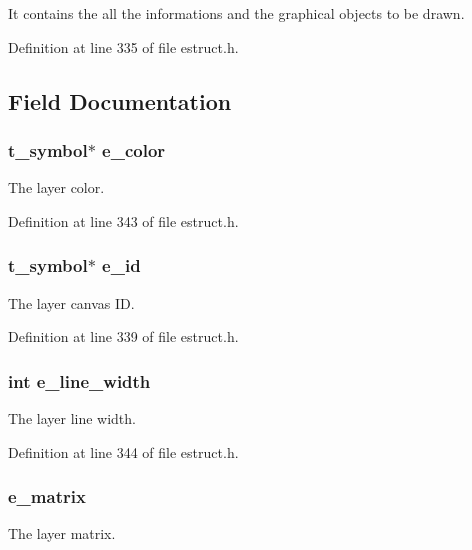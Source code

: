 It contains the all the informations and the graphical objects to be drawn. 

Definition at line 335 of file estruct.\-h.



\subsection{Field Documentation}
\hypertarget{struct__elayer_a13dfb00aea95e0dc5b9d1297260a9280}{
\subsubsection[{e\-\_\-color}]{\setlength{\rightskip}{0pt plus 5cm}t\-\_\-symbol$\ast$ e\-\_\-color}}\label{struct__elayer_a13dfb00aea95e0dc5b9d1297260a9280}
The layer color. 

Definition at line 343 of file estruct.\-h.

\hypertarget{struct__elayer_a1f5d3d53b83fa9009ede11f8a9902dff}{
\subsubsection[{e\-\_\-id}]{\setlength{\rightskip}{0pt plus 5cm}t\-\_\-symbol$\ast$ e\-\_\-id}}\label{struct__elayer_a1f5d3d53b83fa9009ede11f8a9902dff}
The layer canvas I\-D. 

Definition at line 339 of file estruct.\-h.

\hypertarget{struct__elayer_a4f088d61988de49543e814d4b5a74947}{
\subsubsection[{e\-\_\-line\-\_\-width}]{\setlength{\rightskip}{0pt plus 5cm}int e\-\_\-line\-\_\-width}}\label{struct__elayer_a4f088d61988de49543e814d4b5a74947}
The layer line width. 

Definition at line 344 of file estruct.\-h.

\hypertarget{struct__elayer_a62d53e14693deed3469c69dc3a857493}{
\subsubsection[{e\-\_\-matrix}]{ e\-\_\-matrix}}\label{struct__elayer_a62d53e14693deed3469c69dc3a857493}
The layer matrix. 

